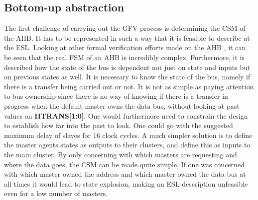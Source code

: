 \subsection{Bottom-up abstraction}
The first challenge of carrying out the GFV process is determining the CSM of the AHB. It has to be represented in such a way that it is feasible to describe at the ESL. Looking at other formal verification efforts made on the AHB \cite{ahbformal}, it can be seen that the real FSM of an AHB is incredibly complex. Furthermore, it is described how the state of the bus is dependent not just on state and inputs but on previous states as well. It is necessary to know the state of the bus, namely if there is a transfer being carried out or not. It is not as simple as paying attention to bus ownership since there is no way of knowing if there is a transfer in progress when the default master owns the data bus, without looking at past values on \textbf{HTRANS[1:0]}. One would furthermore need to constrain the design to establish how far into the past to look. One could go with the suggested maximum delay of slaves for 16 clock cycles. A much simpler solution is to define the master agents states as outputs to their clusters, and define this as inputs to the main cluster. By only concerning with which masters are requesting and where the data goes, the CSM can be made quite simple. If one was concerned with which master owned the address and which master owned the data bus at all times it would lead to state explosion, making an ESL description unfeasible even for a low number of masters.     


